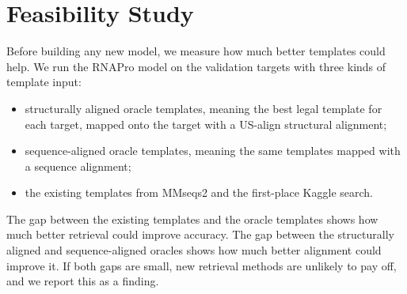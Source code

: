 \documentclass{FastFyp}
\begin{document}
\section{Feasibility Study}
\label{sec:feasibility}
Before building any new model, we measure how much better templates could help. We run the RNAPro model on the validation targets with three kinds of template input:
\begin{itemize}
  \item structurally aligned oracle templates, meaning the best legal template for each target, mapped onto the target with a US-align structural alignment;
  \item sequence-aligned oracle templates, meaning the same templates mapped with a sequence alignment;
  \item the existing templates from MMseqs2 and the first-place Kaggle search.
\end{itemize}
The gap between the existing templates and the oracle templates shows how much better retrieval could improve accuracy. The gap between the structurally aligned and sequence-aligned oracles shows how much better alignment could improve it. If both gaps are small, new retrieval methods are unlikely to pay off, and we report this as a finding.
\end{document}
